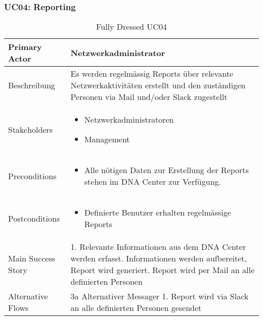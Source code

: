 \subsubsection{UC04: Reporting}
\begin{table}[H]
	\centering
	\begin{tabularx}{\textwidth}{l | X}
		Primary Actor   & Netzwerkadministrator        \\
		\hline
		Beschreibung   & Es werden regelmässig Reports über relevante Netzwerkaktivitäten erstellt und den zuständigen Personen via Mail und/oder Slack zugestellt  \\ 
		\hline
		Stakeholders       & 
		\begin{itemize}
			\item Netzwerkadministratoren
			\item Management
		\end{itemize} \\ 
		Preconditions      &
		\begin{itemize}	
			\item Alle nötigen Daten zur Erstellung der Reports stehen im DNA Center zur Verfügung.
		\end{itemize}  \\
		\hline
		Postconditions     & 
		\begin{itemize}	
			\item Definierte Benutzer erhalten regelmässige Reports
		\end{itemize}  \\
		\hline
		Main Success Story & 
		1.  Relevante Informationen aus dem DNA Center werden erfasst\newline
		2.  Informationen werden aufbereitet, Report wird generiert\newline
		3.  Report wird per Mail an alle definierten Personen \newline
		\\
		\hline
		Alternative Flows  & 
		3a Alternativer Messager \newline
		\noindent\hspace*{6mm} 1. Report wird via Slack an alle definierten Personen gesendet \newline
	\end{tabularx}
	\caption{Fully Dressed UC04}
	\label{tab:UC04}
\end{table}
